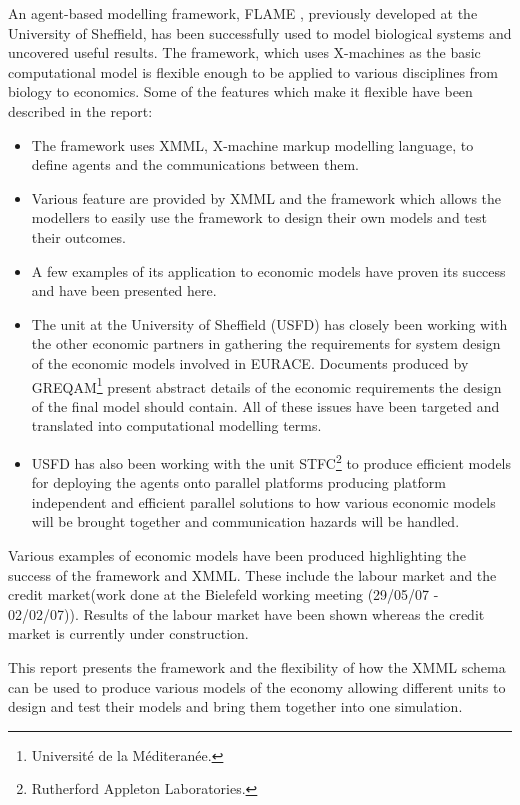 \documentclass[a4paper,11pt]{article}
\begin{document}
An agent-based modelling framework, FLAME \cite{COAKLEY:thesis},
previously developed at the University of Sheffield, has been
successfully used to model biological systems and uncovered useful
results. The framework, which uses X-machines as the basic
computational model is flexible enough to be applied to various
disciplines from biology to economics. Some of the features which
make it flexible have been described in the report:
\begin{itemize}
\item The framework uses XMML, X-machine markup modelling language, to
define agents and the communications between them.
\item Various
feature are provided by XMML and the framework which allows the
modellers to easily use the framework to design their own models and
test their outcomes.
\item A few examples of its application to
economic models have proven its success and have been presented
here.
\item The unit at the University of Sheffield (USFD) has closely been
working with the other economic partners in gathering the
requirements for system design of the economic models involved in
EURACE. Documents produced by GREQAM\footnote{Universit\'{e} de la
M\'{e}diteran\'{e}e.} present abstract details of the economic
requirements the design of the final model should contain. All of
these issues have been targeted and translated into computational
modelling terms. \item USFD has also been working with the unit
STFC\footnote{Rutherford Appleton Laboratories.} to produce
efficient models for deploying the agents onto parallel platforms
producing platform independent and efficient parallel solutions to
how various economic models will be brought together and
communication hazards will be handled.
\end{itemize}
Various examples of economic models have been produced highlighting
the success of the framework and XMML. These include the labour
market and the credit market(work done at the Bielefeld working
meeting (29/05/07 - 02/02/07)). Results of the labour market have
been shown whereas the credit market is currently under
construction.

This report presents the framework and the flexibility of how the
XMML schema can be used to produce various models of the economy
allowing different units to design and test their models and bring
them together into one simulation.
\end{document}
